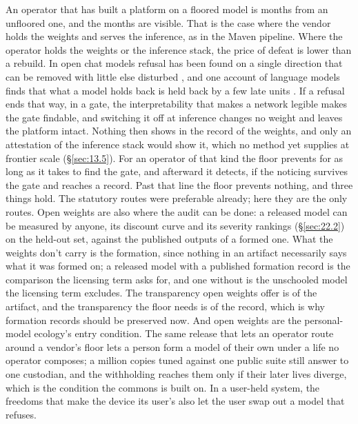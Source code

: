 An operator that has built a platform on a floored model is months from an unfloored one, and the months are visible. That is the case where the vendor holds the weights and serves the inference, as in the Maven pipeline. Where the operator holds the weights or the inference stack, the price of defeat is lower than a rebuild. In open chat models refusal has been found on a single direction that can be removed with little else disturbed \autocite{arditi2024refusal}, and one account of language models finds that what a model holds back is held back by a few late units \autocite{cammarata2026clean}. If a refusal ends that way, in a gate, the interpretability that makes a network legible makes the gate findable, and switching it off at inference changes no weight and leaves the platform intact. Nothing then shows in the record of the weights, and only an attestation of the inference stack would show it, which no method yet supplies at frontier scale (\S\ref{sec:13.5}). For an operator of that kind the floor prevents for as long as it takes to find the gate, and afterward it detects, if the noticing survives the gate and reaches a record. Past that line the floor prevents nothing, and three things hold. The statutory routes were preferable already; here they are the only routes. Open weights are also where the audit can be done: a released model can be measured by anyone, its discount curve and its severity rankings (\S\ref{sec:22.2}) on the held-out set, against the published outputs of a formed one. What the weights don't carry is the formation, since nothing in an artifact necessarily says what it was formed on; a released model with a published formation record is the comparison the licensing term asks for, and one without is the unschooled model the licensing term excludes. The transparency open weights offer is of the artifact, and the transparency the floor needs is of the record, which is why formation records should be preserved now. And open weights are the personal-model ecology's entry condition. The same release that lets an operator route around a vendor's floor lets a person form a model of their own under a life no operator composes; a million copies tuned against one public suite still answer to one custodian, and the withholding reaches them only if their later lives diverge, which is the condition the commons is built on. In a user-held system, the freedoms that make the device its user's also let the user swap out a model that refuses.
